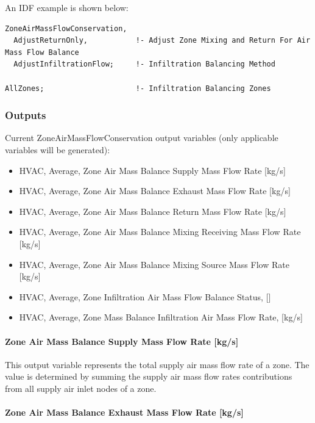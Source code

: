 An IDF example is shown below:

\begin{lstlisting}
ZoneAirMassFlowConservation,
  AdjustReturnOnly,           !- Adjust Zone Mixing and Return For Air Mass Flow Balance
  AdjustInfiltrationFlow;     !- Infiltration Balancing Method

AllZones;                     !- Infiltration Balancing Zones
\end{lstlisting}

\subsubsection{Outputs}\label{outputs-7-000}

Current ZoneAirMassFlowConservation output variables (only applicable variables will be generated):

\begin{itemize}
\item
  HVAC, Average, Zone Air Mass Balance Supply Mass Flow Rate {[}kg/s{]}
\item
  HVAC, Average, Zone Air Mass Balance Exhaust Mass Flow Rate {[}kg/s{]}
\item
  HVAC, Average, Zone Air Mass Balance Return Mass Flow Rate {[}kg/s{]}
\item
  HVAC, Average, Zone Air Mass Balance Mixing Receiving Mass Flow Rate {[}kg/s{]}
\item
  HVAC, Average, Zone Air Mass Balance Mixing Source Mass Flow Rate {[}kg/s{]}
\item
  HVAC, Average, Zone Infiltration Air Mass Flow Balance Status, {[]}
\item
  HVAC, Average, Zone Mass Balance Infiltration Air Mass Flow Rate, {[}kg/s{]}
\end{itemize}

\paragraph{Zone Air Mass Balance Supply Mass Flow Rate {[}kg/s{]}}\label{zone-air-mass-balance-supply-mass-flow-rate-kgs}

This output variable represents the total supply air mass flow rate of a zone. The value is determined by summing the supply air mass flow rates contributions from all supply air inlet nodes of a zone.

\paragraph{Zone Air Mass Balance Exhaust Mass Flow Rate {[}kg/s{]}}\label{zone-air-mass-balance-exhaust-mass-flow-rate-kgs}

